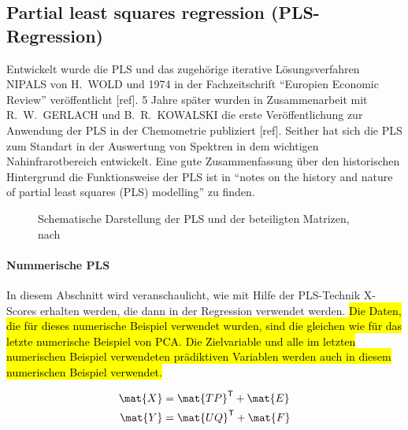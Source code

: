 


\subsection{Partial least squares regression (PLS-Regression)}
Entwickelt wurde die \gls{PLS} und das zugehörige iterative Lösungsverfahren  \gls{NIPALS} von H.~\uppercase{Wold} und 1974 in der Fachzeitschrift \enquote{Europien Economic Review} veröffentlicht [ref].
5 Jahre später wurden in Zusammenarbeit mit R.~W.~\uppercase{Gerlach} und B.~R.~\uppercase{Kowalski} die erste Veröffentlichung zur Anwendung der \gls{PLS} in der Chemometrie publiziert [ref].
Seither hat sich die \gls{PLS} zum Standart in der Auswertung von Spektren in dem wichtigen Nahinfrarotbereich entwickelt.
Eine gute Zusammenfassung über den historischen Hintergrund die Funktionsweise der PLS ist in \enquote{notes on the history and nature of partial least squares (PLS) modelling} \cite{geladi_1988} zu finden.
\begin{figure}[htb]
    \centering
    
    \caption{Schematische Darstellung der PLS und der beteiligten Matrizen, nach \cite{kessler_2008}}
    \label{fig:PLS}
\end{figure}

\paragraph{Nummerische PLS}
In diesem Abschnitt wird veranschaulicht, wie mit Hilfe der PLS-Technik X-Scores erhalten werden, die dann in der Regression verwendet werden.
 \hl{Die Daten, die für dieses numerische Beispiel verwendet wurden, sind die gleichen wie für das letzte numerische Beispiel von PCA.
Die Zielvariable und alle im letzten numerischen Beispiel verwendeten prädiktiven Variablen werden auch in diesem numerischen Beispiel verwendet.}

\begin{subequations}
    \begin{align}
        \mat{X} &= \mat{TP}^\mathsf{T} + \mat{E} \\
        \mat{Y} &= \mat{UQ}^\mathsf{T} + \mat{F}
    \end{align}
\end{subequations}


